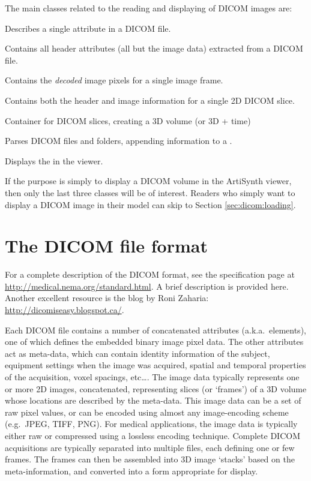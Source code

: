 The main classes related to the reading and displaying of DICOM images are:
\begin{lstdescription}
   \item[{\protect \javaclass[maspack.dicom]{DicomElement}}] Describes a single attribute in a DICOM file.
   \item[{\protect \javaclass[maspack.dicom]{DicomHeader}}] Contains all header attributes (all but the image data) extracted from a DICOM file.
   \item[{\protect \javaclass[maspack.dicom]{DicomPixelBuffer}}] Contains the \emph{decoded} image pixels for a single image frame.
   \item[{\protect \javaclass[maspack.dicom]{DicomSlice}}] Contains both the header and image information for a single 2D DICOM slice.
   \item[{\protect \javaclass[maspack.dicom]{DicomImage}}] Container for DICOM slices, creating a 3D volume (or 3D + time)
   \item[{\protect \javaclass[maspack.dicom]{DicomReader}}] Parses DICOM files and folders, appending information to a . 
   \item[{\protect \javaclass[artisynth.core.renderables]{DicomViewer}}] Displays the  in the viewer.
\end{lstdescription}
If the purpose is simply to display a DICOM volume in the ArtiSynth viewer, then only the last three classes will be of interest.  Readers who simply want to display a DICOM image in their model can skip to Section \ref{sec:dicom:loading}.

\section{The DICOM file format}

For a complete description of the DICOM format, see the specification page at \url{http://medical.nema.org/standard.html}.  A brief
description is provided here.  Another excellent resource is the blog by Roni Zaharia: \url{http://dicomiseasy.blogspot.ca/}.

Each DICOM file contains a number of concatenated attributes (a.k.a.~elements), one of which defines the embedded binary image pixel data.  The other attributes act as meta-data, which can contain identity information of the subject, equipment settings when the image was acquired, spatial and temporal properties of the acquisition, voxel spacings, etc\ldots.  The image data typically represents one or more 2D images, concatenated, representing slices (or `frames') of a 3D volume whose locations are described by the meta-data.  This image data can be a set of raw pixel values, or can be encoded using almost any image-encoding scheme (e.g.~JPEG, TIFF, PNG).  For medical applications, the image data is typically either raw or compressed using a lossless encoding technique.  Complete DICOM acquisitions are typically separated into multiple files, each defining one or few frames.  The frames can then be assembled into 3D image `stacks' based on the meta-information, and converted into a form appropriate for display.

